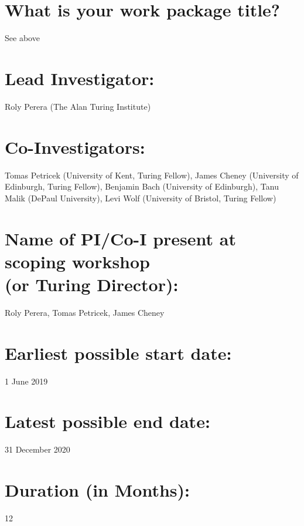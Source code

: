 \section*{What is your work package title?}
See above

\section*{Lead Investigator:}
Roly Perera (The Alan Turing Institute)

\section*{Co-Investigators:}

Tomas Petricek (University of Kent, Turing Fellow), James Cheney (University of
Edinburgh, Turing Fellow), Benjamin Bach (University of Edinburgh), Tanu Malik
(DePaul University), Levi Wolf (University of Bristol, Turing Fellow)

\section*{Name of PI/Co-I present at scoping workshop \\(or Turing Director):}
Roly Perera, Tomas Petricek, James Cheney

\section*{Earliest possible start date:}
1 June 2019

\section*{Latest possible end date:}
31 December 2020

\section*{Duration (in Months):}
12









